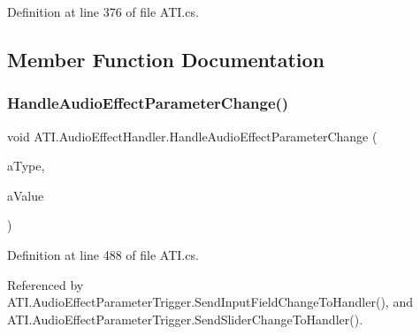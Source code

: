 Definition at line 376 of file A\+T\+I.\+cs.



\subsection{Member Function Documentation}
\mbox{\label{class_a_t_i_1_1_audio_effect_handler_a298f455be06ae16a870fa291337a77c6}} 
\subsubsection{\texorpdfstring{Handle\+Audio\+Effect\+Parameter\+Change()}{HandleAudioEffectParameterChange()}}
{\footnotesize\ttfamily void A\+T\+I.\+Audio\+Effect\+Handler.\+Handle\+Audio\+Effect\+Parameter\+Change (\begin{DoxyParamCaption}\item[{\hyperlink{class_a_t_i_a1123d61b8dceb5867a3683e8d2224ee1}{Audio\+Effect\+Parameter\+Type}}]{a\+Type,  }\item[{float}]{a\+Value }\end{DoxyParamCaption})}



Definition at line 488 of file A\+T\+I.\+cs.



Referenced by A\+T\+I.\+Audio\+Effect\+Parameter\+Trigger.\+Send\+Input\+Field\+Change\+To\+Handler(), and A\+T\+I.\+Audio\+Effect\+Parameter\+Trigger.\+Send\+Slider\+Change\+To\+Handler().


